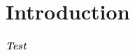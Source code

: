 \documentclass[12pt]{report}
\begin{document}
\chapter{Introduction}
\paragraph{Test
}
\lipsum[1-5]
\end{document}

